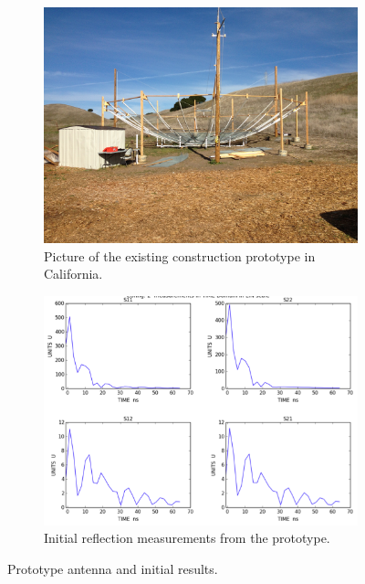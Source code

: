 \documentclass[preprint]{aastex}
\begin{document}
\begin{figure}[h]
	\centering
	\begin{subfigure}[b]{0.46\textwidth}
		\includegraphics[width=\textwidth]{plots/heracles.png}
		\caption{Picture of the existing construction prototype in California.}
	\end{subfigure}
	\quad
	\begin{subfigure}[b]{0.46\textwidth}
		\includegraphics[width=\textwidth]{plots/heraclesNA.png}
		\caption{Initial reflection measurements from the prototype.}
	\end{subfigure}
	\caption{Prototype antenna and initial results.}
	\label{fig:heracles}
\end{figure}
\end{document}
